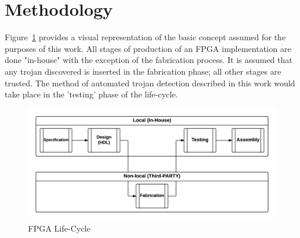 \label{chapter:trojanDetection}

\section{Methodology}
Figure~\ref{fig:Concept} provides a visual representation of the basic concept assumed for the purposes of this work. 
All stages of production of an \acrshort{FPGA} implementation are done "in-house" with the exception of the fabrication process. 
It is assumed that any trojan discovered is inserted in the fabrication phase; all other stages are trusted.  
The method of automated trojan detection described in this work would take place in the 'testing' phase of the life-cycle. 
\begin{figure}[h]
	\centering
	\includegraphics[width=1\linewidth]{figures/Concept}
	\caption[FPGA Life-Cycle]{FPGA Life-Cycle}
	\label{fig:Concept}
\end{figure}

